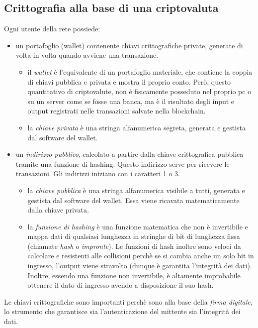 \subsection{Crittografia alla base di una criptovaluta}
Ogni utente della rete possiede: 
\begin{itemize}
\item un portafoglio (wallet) contenente chiavi crittografiche private, generate di volta in volta quando avviene una transazione. 
\begin{itemize}
\item il \textit{wallet} \`e l'equivalente di un portafoglio materiale, che contiene la coppia di chiavi pubblica e privata e mostra il proprio conto. Però, questo quantitativo di criptovalute, non \`e fisicamente posseduto nel proprio pc o su un server come se fosse una banca, ma \`e il risultato degli input e output registrati nelle transazioni salvate nella blockchain. 
\item la \textit{chiave privata} \`e una stringa alfanumerica segreta, generata e gestista dal software del wallet.
\end{itemize}
\item un \textit{indirizzo pubblico}, calcolato a partire dalla chiave crittografica pubblica tramite una funzione di hashing. Questo indirizzo serve per ricevere le transazioni. Gli indirizzi iniziano con i caratteri 1 o 3.
\begin{itemize}
\item la \textit{chiave pubblica} \`e una stringa alfanumerica visibile a tutti, generata e gestista dal software del wallet. Essa viene ricavata matematicamente dalla chiave privata. 
\item la \textit{funzione di hashing} \`e una funzione matematica che non \`e invertibile e mappa dati di qualsiasi lunghezza in stringhe di bit di lunghezza fissa (chiamate \textit{hash} o \textit{impronte}). Le funzioni di hash inoltre sono veloci da calcolare e resistenti alle collisioni perch\`e se si cambia anche un solo bit in ingresso, l’output viene stravolto (dunque \`e garantita l'integrità dei dati). Inoltre, essendo una funzione non invertibile, \`e altamente improbabile ottenere il dato di ingresso avendo a disposizione il suo hash.
\end{itemize}
\end{itemize}
Le chiavi crittografiche sono importanti perch\`e sono alla base della \textit{firma digitale}, lo strumento che garantisce sia l’autenticazione del mittente sia l’integrità dei dati. 

